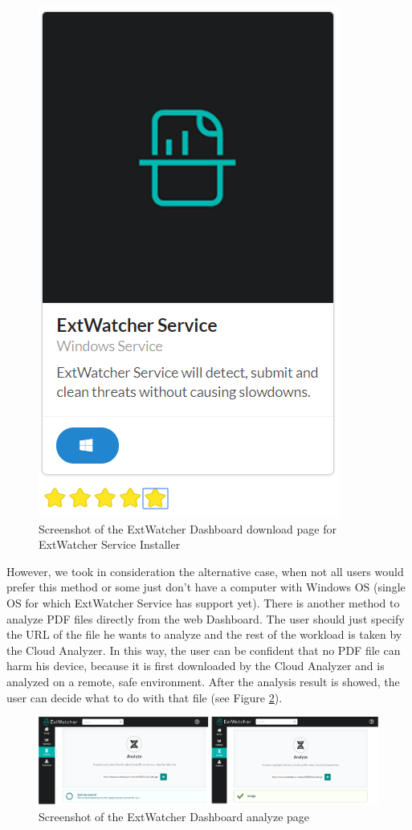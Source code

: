 \begin{figure}[H]
	\centerline{\includegraphics[scale=0.45]{figures/installer.png}}  
	\caption{Screenshot of the ExtWatcher Dashboard download page for ExtWatcher Service Installer}
	\label{screenshot:installer}
\end{figure}

However, we took in consideration the alternative case, when not all users would prefer this method or some just don't have a computer with Windows OS (single OS for which ExtWatcher Service has support yet). There is another method to analyze PDF files directly from the web Dashboard. The user should just specify the URL of the file he wants to analyze and the rest of the workload is taken by the Cloud Analyzer. In this way, the user can be confident that no PDF file can harm his device, because it is first downloaded by the Cloud Analyzer and is analyzed on a remote, safe environment. After the analysis result is showed, the user can decide what to do with that file (see Figure \ref{screenshot:analyze}).

\begin{figure}[H]
	\centerline{\includegraphics[scale=0.35]{figures/analyze.png}}  
	\caption{Screenshot of the ExtWatcher Dashboard analyze page}
	\label{screenshot:analyze}
\end{figure}